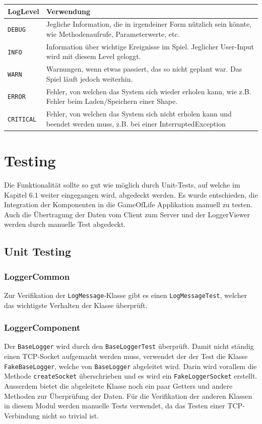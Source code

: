 \documentclass[12pt,a4paper,twosided]{scrartcl}
\begin{document}
\begin{tabularx}{\textwidth}{|l|X|}
	\hline \textbf{LogLevel} & \textbf{Verwendung} \\ \hline
	\texttt{DEBUG} & Jegliche Information, die in irgendeiner Form nützlich sein könnte, wie Methodenaufrufe, Parameterwerte, etc.       \\ \hline
	\texttt{INFO} & Information über wichtige Ereignisse im Spiel. Jeglicher User-Input wird mit diesem Level geloggt.                  \\  \hline
	\texttt{WARN} & Warnungen, wenn etwas passiert, das so nicht geplant war. Das Spiel läuft jedoch weiterhin.                         \\  \hline
	\texttt{ERROR} & Fehler, von welchen das System sich wieder erholen kann, wie z.B. Fehler beim Laden/Speichern einer Shape.          \\  \hline
	\texttt{CRITICAL} & Fehler, von welchen das System sich nicht erholen kann und beendet werden muss, z.B. bei einer InterruptedException \\  \hline
\end{tabularx}

\newpage

\section{Testing}
Die Funktionalität sollte so gut wie möglich durch Unit-Tests, auf welche im Kapitel 6.1 weiter eingegangen wird, abgedeckt werden. Es wurde entschieden, die Integration der Komponenten in die GameOfLife Applikation manuell zu testen. Auch die Übertragung der Daten vom Client zum Server und der LoggerViewer werden durch manuelle Test abgedeckt.

\subsection{Unit Testing}
\subsubsection{LoggerCommon}
Zur Verifikation der \texttt{LogMessage}-Klasse gibt es einen \texttt{LogMessageTest}, welcher das wichtigste Verhalten der Klasse überprüft.

\subsubsection{LoggerComponent}
Der \texttt{BaseLogger} wird durch den \texttt{BaseLoggerTest} überprüft. Damit nicht ständig einen TCP-Socket aufgemacht werden muss, verwendet der der Test die Klasse \texttt{FakeBaseLogger}, welche von \texttt{BaseLogger} abgeleitet wird. Darin wird vorallem die Methode \texttt{createSocket} überschrieben und es wird ein \texttt{FakeLoggerSocket} erstellt. Ausserdem bietet die abgeleitete Klasse noch ein paar Getters und andere Methoden zur Überprüfung der Daten. Für die Verifikation der anderen Klassen in diesem Modul werden manuelle Tests verwendet, da das Testen einer TCP-Verbindung nicht so trivial ist.
\end{document}

